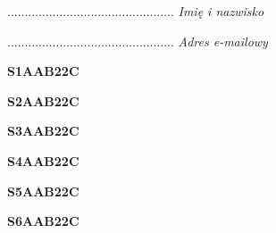 \begin{turn}{90}\begin{minipage}{\linewidth} \vspace{20mm} ................................................  \textit{Imię i nazwisko}\end{minipage}\end{turn}

\begin{turn}{90}\begin{minipage}{\linewidth} \vspace{20mm} ................................................  \textit{Adres e-mailowy}\end{minipage}\end{turn}

\begin{turn}{90}\huge \begin{minipage}{\linewidth} \vspace{10mm}\textbf{S1AAB22C}\end{minipage}\end{turn}

\begin{turn}{90}\huge \begin{minipage}{\linewidth} \vspace{10mm}\textbf{S2AAB22C}\end{minipage}\end{turn}

\begin{turn}{90}\huge \begin{minipage}{\linewidth} \vspace{10mm}\textbf{S3AAB22C}\end{minipage}\end{turn}

\begin{turn}{90}\huge \begin{minipage}{\linewidth} \vspace{10mm}\textbf{S4AAB22C}\end{minipage}\end{turn}

\begin{turn}{90}\huge \begin{minipage}{\linewidth} \vspace{10mm}\textbf{S5AAB22C}\end{minipage}\end{turn}

\begin{turn}{90}\huge \begin{minipage}{\linewidth} \vspace{10mm}\textbf{S6AAB22C}\end{minipage}\end{turn}

